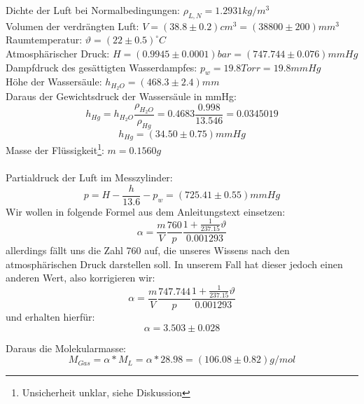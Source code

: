 \documentclass{article}
\begin{document}
Dichte der Luft bei Normalbedingungen: $\rho_{L,N}=1.2931kg/m^3$\\
Volumen der verdrängten Luft: $V=(38.8 \pm 0.2)cm^3=(38800 \pm 200)mm^3$\\
Raumtemperatur: $\vartheta=(22 \pm 0.5)^\circ C$\\
Atmosphärischer Druck: $H=(0.9945 \pm 0.0001)bar=(747.744 \pm 0.076)mmHg$\\
Dampfdruck des gesättigten Wasserdampfes: $p_w=19.8Torr=19.8mmHg$\\
Höhe der Wassersäule: $h_{H_2O}=(468.3 \pm 2.4)mm$\\
Daraus der Gewichtsdruck der Wassersäule in mmHg:
$$h_{Hg}=h_{H_2O}\frac{\rho_{H_2O}}{\rho_{Hg}}=0.4683\frac{0.998}{13.546}=0.0345019$$
$$h_{Hg}=(34.50 \pm 0.75)mmHg$$
Masse der Flüssigkeit\footnote{Unsicherheit unklar, siehe Diskussion}: $m=0.1560g$\\
\\
Partialdruck der Luft im Messzylinder:
\begin{equation}
p=H-\frac{h}{13.6}-p_w=(725.41 \pm 0.55)mmHg
\end{equation}
Wir wollen in folgende Formel aus dem Anleitungstext einsetzen: 
$$\alpha=\frac{m}{V}\frac{760}{p}\frac{1+\frac{1}{237.15}\vartheta}{0.001293}$$
allerdings fällt uns die Zahl 760 auf, die unseres Wissens nach den atmosphärischen Druck darstellen soll. In unserem Fall hat dieser jedoch einen anderen Wert, also korrigieren wir: 
\begin{equation}
\alpha=\frac{m}{V}\frac{747.744}{p}\frac{1+\frac{1}{237.15}\vartheta}{0.001293}
\end{equation}
und erhalten hierfür:
$$\boxed{\alpha=3.503\pm 0.028}$$

Daraus die Molekularmasse:\\
$$M_{Gas}=\alpha*M_L=\alpha*28.98=(106.08 \pm 0.82)g/mol$$
\end{document}

